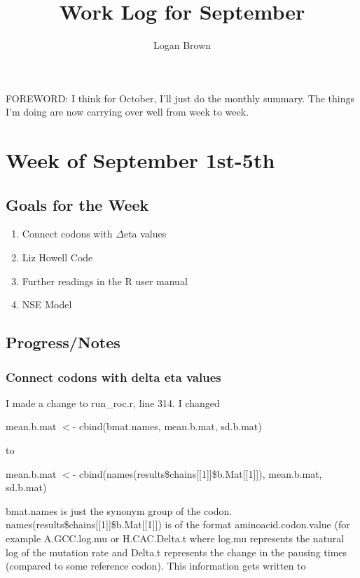 

\title{Work Log for September}
\author{Logan Brown}


\maketitle

FOREWORD: I think for October, I'll just do the monthly summary. The things I'm doing are now carrying over well from week to week.

\tableofcontents

\newpage


\setcounter{section}{0} %
\setcounter{subsection}{-1}
\setcounter{subsubsection}{0}

\section{Week of September 1st-5th}
\subsection{Goals for the Week}
\begin{enumerate}
\item Connect codons with $\Delta$eta values
\item Liz Howell Code
\item Further readings in the R user manual
\item NSE Model
\end{enumerate}

\subsection{Progress/Notes}

\subsubsection{Connect codons with delta eta values}
I made a change to run\_roc.r, line 314. I changed

\noindent mean.b.mat $<$- cbind(bmat.names, mean.b.mat, sd.b.mat)

	to
	
\noindent mean.b.mat $<$- cbind(names(results\$chains[[1]]\$b.Mat[[1]]), mean.b.mat, sd.b.mat)

bmat.names is just the synonym group of the codon. names(results\$chains[[1]]\$b.Mat[[1]]) is of the format aminoacid.codon.value (for example A.GCC.log.mu or H.CAC.Delta.t where log.mu represents the natural log of the mutation rate and Delta.t represents the change in the pausing times (compared to some reference codon). This information gets written to 

